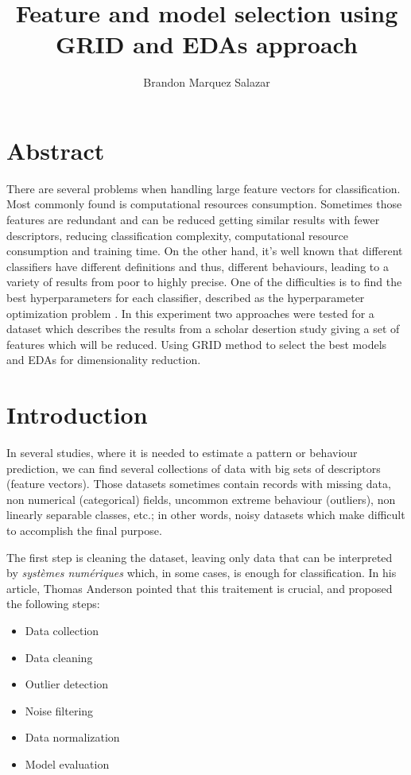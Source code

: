 \documentclass[10pt]{IEEEtran}
\author{%
Brandon Marquez Salazar
}
\title{%
Feature and model selection using GRID and EDAs approach
}
\begin{document}
  \maketitle
\section{ Abstract }
There are several problems when handling large feature vectors for classification. Most commonly found is
computational resources consumption. Sometimes those features are redundant and can be reduced
getting similar results with fewer descriptors, reducing classification complexity, computational
resource consumption and training time.
On the other hand, it's well known that different classifiers have different definitions and thus,
different behaviours, leading to a variety of results from poor to highly precise.
One of the difficulties is to find the best hyperparameters for each classifier, described as
the hyperparameter optimization problem \cite{AutoMLBook2019}.
In this experiment two approaches were tested for a dataset which describes the results from a scholar
desertion study \cite{https://doi.org/10.24432/c5mc89}
giving a set of features which will be reduced. Using GRID method to select the best models
and EDAs for dimensionality reduction.

\section{ Introduction }
In several studies, where it is needed to estimate a pattern or behaviour prediction, we can find
several collections of data with big sets of descriptors (feature vectors). Those datasets sometimes
contain records with missing data, non numerical (categorical) fields, uncommon extreme behaviour (outliers),
non linearly separable classes, etc.; in other words, noisy datasets
\cite{article/2024_Anderson_Thomas_Adelusi_Joshua} which make difficult to accomplish the final purpose.

The first step is cleaning the dataset, leaving only data that can be interpreted by
\textit{systèmes numériques} which, in some cases, is enough for classification.
In his article, Thomas Anderson pointed that this traitement is crucial, and proposed the
following steps:

\begin{itemize}
  \item Data collection
  \item Data cleaning
  \item Outlier detection
  \item Noise filtering
  \item Data normalization
  \item Model evaluation
\end{itemize}
\end{document}
